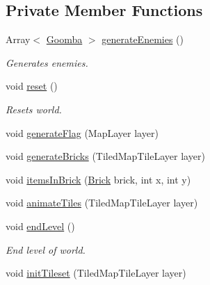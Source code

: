 \subsection*{Private Member Functions}
\begin{DoxyCompactItemize}
\item 
Array$<$ \hyperlink{classnl_1_1arjanfrans_1_1mario_1_1model_1_1Goomba}{Goomba} $>$ \hyperlink{classnl_1_1arjanfrans_1_1mario_1_1model_1_1World_ae0be61c4e82de092bab3e6c7a9e04383}{generate\+Enemies} ()
\begin{DoxyCompactList}\small\item\em Generates enemies. \end{DoxyCompactList}\item 
\mbox{\label{classnl_1_1arjanfrans_1_1mario_1_1model_1_1World_adfbd50ffb0a859a2aec0fe5d00e87e2e}} 
void \hyperlink{classnl_1_1arjanfrans_1_1mario_1_1model_1_1World_adfbd50ffb0a859a2aec0fe5d00e87e2e}{reset} ()
\begin{DoxyCompactList}\small\item\em Resets world. \end{DoxyCompactList}\item 
void \hyperlink{classnl_1_1arjanfrans_1_1mario_1_1model_1_1World_a5cd9c89d5e9a185c4b82b5bc2914967e}{generate\+Flag} (Map\+Layer layer)
\item 
void \hyperlink{classnl_1_1arjanfrans_1_1mario_1_1model_1_1World_a8d330159c1694a0ccd3cb7304adfe9bb}{generate\+Bricks} (Tiled\+Map\+Tile\+Layer layer)
\item 
void \hyperlink{classnl_1_1arjanfrans_1_1mario_1_1model_1_1World_a6dfa1226bc95fa7ad434f7f14b96e527}{items\+In\+Brick} (\hyperlink{classnl_1_1arjanfrans_1_1mario_1_1model_1_1Brick}{Brick} brick, int x, int y)
\item 
void \hyperlink{classnl_1_1arjanfrans_1_1mario_1_1model_1_1World_a872a94f433d059bee4fa1e73afcce3e4}{animate\+Tiles} (Tiled\+Map\+Tile\+Layer layer)
\item 
\mbox{\label{classnl_1_1arjanfrans_1_1mario_1_1model_1_1World_a4faf88730ba85a63e7100c8d0cc0d126}} 
void \hyperlink{classnl_1_1arjanfrans_1_1mario_1_1model_1_1World_a4faf88730ba85a63e7100c8d0cc0d126}{end\+Level} ()
\begin{DoxyCompactList}\small\item\em End level of world. \end{DoxyCompactList}\item 
void \hyperlink{classnl_1_1arjanfrans_1_1mario_1_1model_1_1World_a660856f043c0ecd47c4dd256c3816512}{init\+Tileset} (Tiled\+Map\+Tile\+Layer layer)
\end{DoxyCompactItemize}
